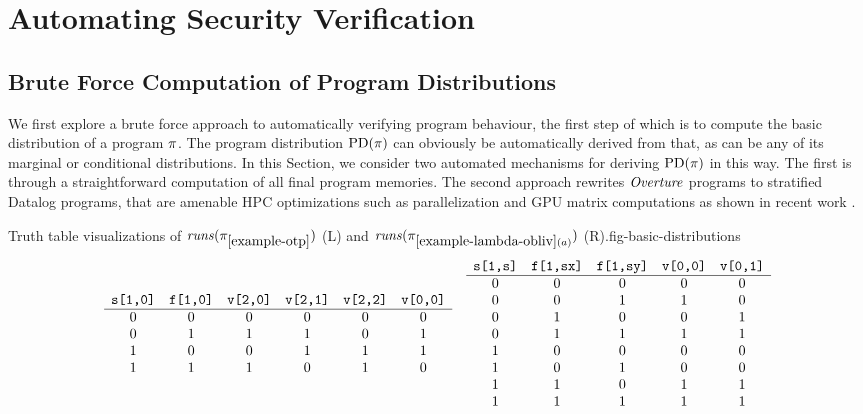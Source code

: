 \section{Automating Security Verification}
\label{section-automation}

\subsection{Brute Force Computation of Program Distributions}
\label{section-bruteforce}

We first explore a brute force approach to automatically verifying
program behaviour, the first step of which is to compute the basic
distribution of a program $\pi$. The program distribution
$\mathrm{PD}(\pi)$ can obviously be automatically derived from that, as
can be any of its marginal or conditional distributions. In this
Section, we consider two automated mechanisms for deriving
$\mathrm{PD}(\pi)$ in this way. The first is through a straightforward
computation of all final program memories.  The second approach
rewrites $\mathit{Overture}$ programs to stratified Datalog programs, that are
amenable HPC optimizations such as parallelization and GPU matrix
computations as shown in recent work
\cite{sakama2017linear,aspis2018linear,nguyen2022enhancing,nguyen2021efficient}.

\begin{fpfig}[t]{Truth table visualizations of $\mathit{runs}(\pi_{\ref{example-otp}})$ (L) and
    $\mathit{runs}(\pi_{\ref{example-lambda-obliv}(a)})$ (R).}{fig-basic-distributions}
{\footnotesize
  $$
  \begin{array}{cc}
    \begin{array}{cccccc}
      \verb+s[1,0]+ & \verb+f[1,0]+ & \verb+v[2,0]+  & \verb+v[2,1]+ & \verb+v[2,2]+ & \verb+v[0,0]+\\
      \hline
      0 & 0 & 0 & 0 & 0 & 0 \\ 
      0 & 1 & 1 & 1 & 0 & 1 \\ 
      1 & 0 & 0 & 1 & 1 & 1 \\ 
      1 & 1 & 1 & 0 & 1 & 0
    \end{array}
    & 
    \begin{array}{ccccc}
      \verb+s[1,s]+ & \verb+f[1,sx]+ & \verb+f[1,sy]+ & \verb+v[0,0]+ & \verb+v[0,1]+ \\
      \hline
      0 & 0 & 0 & 0 & 0 \\ 
      0 & 0 & 1 & 1 & 0 \\ 
      0 & 1 & 0 & 0 & 1 \\ 
      0 & 1 & 1 & 1 & 1 \\
      1 & 0 & 0 & 0 & 0 \\ 
      1 & 0 & 1 & 0 & 0 \\ 
      1 & 1 & 0 & 1 & 1 \\ 
      1 & 1 & 1 & 1 & 1  
    \end{array}
  \end{array}
  $$
}
\end{fpfig}

